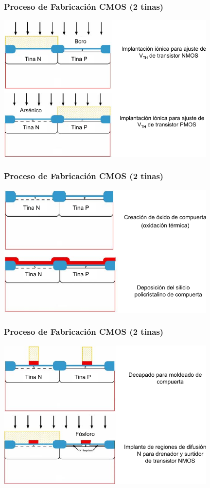 \documentclass[aspectratio=169,10pt]{beamer}
\begin{document}
\begin{frame}
\frametitle{Proceso de Fabricación CMOS (2 tinas)}
\centering
\includegraphics[width=11cm]{CMOS4}
\end{frame}

\begin{frame}
\frametitle{Proceso de Fabricación CMOS (2 tinas)}
\centering
\includegraphics[width=11cm]{CMOS5}
\end{frame}


\begin{frame}
\frametitle{Proceso de Fabricación CMOS (2 tinas)}
\centering
\includegraphics[width=11cm]{CMOS6}
\end{frame}
\end{document}

